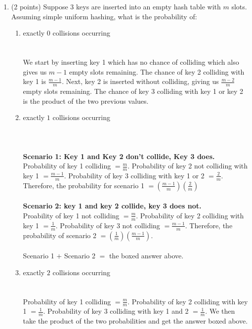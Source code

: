 \documentclass[12pt]{elsart}
\begin{document}
\begin{enumerate}
   \item (2 points) Suppose $3$ keys are inserted into an empty hash table with $m$ slots. Assuming
simple uniform hashing, what is the probability of:
\begin{enumerate}
   \item exactly $0$ collisions occurring\\\\
	\\
	We start by inserting key 1 which has no chance of colliding which also gives us $m-1$ empty slots remaining. The chance of key 2 colliding with key 1 is $\frac{m-1}{m}$. Next, key 2 is inserted without colliding, giving us $\frac{m-2}{m}$ empty slots remaining. The chance of key 3 colliding with key 1 or key 2 is the product of the two previous values.\\
\newpage
   \item exactly $1$ collisions occurring\\\\
	\\\\
	{\bf Scenario 1: Key 1 and Key 2 don't collide, Key 3 does.}\\
	 Probability of key 1 colliding $=\frac{m}{m}$. Probability of key 2 not colliding with key 1 $=\frac{m-1}{m}$. Probability of key 3 colliding with key 1 or 2 $=\frac{2}{m}$. Therefore, the probability for scenario 1 $=(\frac{m-1}{m})(\frac{2}{m})$\\\\
	{\bf Scenario 2: key 1 and key 2 collide, key 3 does not.}\\
	Proability of key 1 not colliding $=\frac{m}{m}$. Probability of key 2 colliding with key 1 $=\frac{1}{m}$. Probability of key 3 not colliding $=\frac{m-1}{m}$. Therefore, the probability of scenario 2 $=(\frac{1}{m})(\frac{m-1}{m})$.\\\\
	Scenario 1 $+$ Scenario 2 $=$ the boxed answer above.\\

   \item exactly $2$ collisions occurring\\\\
	\\
	Probability of key 1 colliding $=\frac{m}{m}$. Probability of key 2 colliding with key 1 $=\frac{1}{m}$. Probability of key 3 colliding with key 1 and 2 $=\frac{1}{m}$. We then take the product of the two probabilities and get the answer boxed above.
\end{enumerate}

\end{enumerate}
\end{document}
